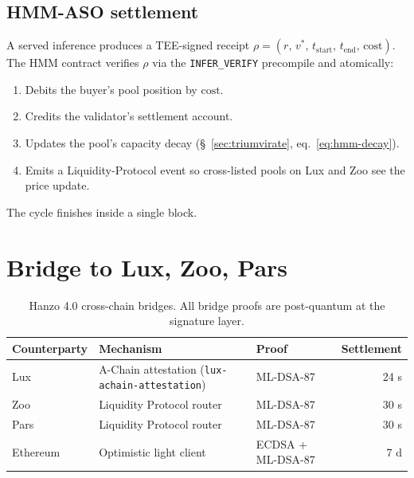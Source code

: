\documentclass[11pt,letterpaper]{article}
\begin{document}
\subsection{HMM-ASO settlement}

A served inference produces a TEE-signed receipt
$\rho = (r,\, v^*,\, t_{\text{start}},\, t_{\text{end}},\,
\mathrm{cost})$. The HMM contract verifies $\rho$ via the
\texttt{INFER\_VERIFY} precompile and atomically:
\begin{enumerate}[leftmargin=*]
\item Debits the buyer's pool position by $\mathrm{cost}$.
\item Credits the validator's settlement account.
\item Updates the pool's capacity decay (\S~\ref{sec:triumvirate}, eq.~\ref{eq:hmm-decay}).
\item Emits a Liquidity-Protocol event so cross-listed pools on Lux
and Zoo see the price update.
\end{enumerate}

The cycle finishes inside a single block.

\section{Bridge to Lux, Zoo, Pars}
\label{sec:bridges}

\begin{table}[H]
\centering
\small
\begin{tabular}{lllr}
\toprule
\textbf{Counterparty} & \textbf{Mechanism} & \textbf{Proof} & \textbf{Settlement} \\
\midrule
Lux & A-Chain attestation (\texttt{lux-achain-attestation}) & ML-DSA-87 & 24 s \\
Zoo & Liquidity Protocol router & ML-DSA-87 & 30 s \\
Pars & Liquidity Protocol router & ML-DSA-87 & 30 s \\
Ethereum & Optimistic light client & ECDSA + ML-DSA-87 & 7 d \\
\bottomrule
\end{tabular}
\caption{Hanzo 4.0 cross-chain bridges. All bridge proofs are
post-quantum at the signature layer.}
\end{table}

\end{document}
